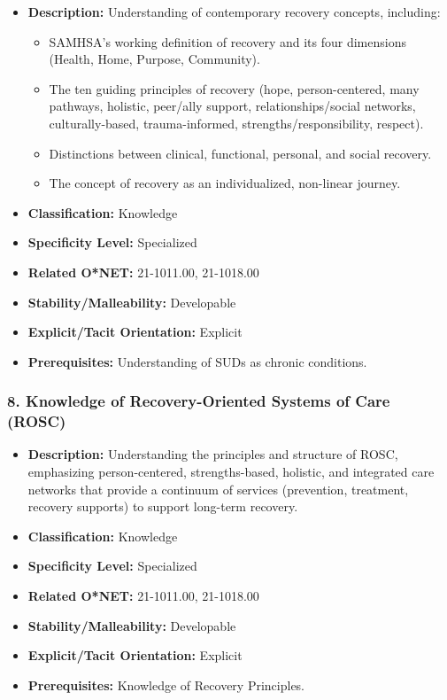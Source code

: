 \documentclass[
  letterpaper,
  DIV=11,
  numbers=noendperiod]{scrartcl}
\providecommand{\tightlist}{%
  \setlength{\itemsep}{0pt}\setlength{\parskip}{0pt}}
\begin{document}
\begin{itemize}
\tightlist
\item
  \textbf{Description:} Understanding of contemporary recovery concepts,
  including:

  \begin{itemize}
  \tightlist
  \item
    SAMHSA's working definition of recovery and its four dimensions
    (Health, Home, Purpose, Community).
  \item
    The ten guiding principles of recovery (hope, person-centered, many
    pathways, holistic, peer/ally support, relationships/social
    networks, culturally-based, trauma-informed,
    strengths/responsibility, respect).
  \item
    Distinctions between clinical, functional, personal, and social
    recovery.
  \item
    The concept of recovery as an individualized, non-linear journey.
  \end{itemize}
\item
  \textbf{Classification:} Knowledge
\item
  \textbf{Specificity Level:} Specialized
\item
  \textbf{Related O*NET:} 21-1011.00, 21-1018.00
\item
  \textbf{Stability/Malleability:} Developable
\item
  \textbf{Explicit/Tacit Orientation:} Explicit
\item
  \textbf{Prerequisites:} Understanding of SUDs as chronic conditions.
\end{itemize}

\subsubsection{8. Knowledge of Recovery-Oriented Systems of Care
(ROSC)}\label{knowledge-of-recovery-oriented-systems-of-care-rosc}

\begin{itemize}
\tightlist
\item
  \textbf{Description:} Understanding the principles and structure of
  ROSC, emphasizing person-centered, strengths-based, holistic, and
  integrated care networks that provide a continuum of services
  (prevention, treatment, recovery supports) to support long-term
  recovery.
\item
  \textbf{Classification:} Knowledge
\item
  \textbf{Specificity Level:} Specialized
\item
  \textbf{Related O*NET:} 21-1011.00, 21-1018.00
\item
  \textbf{Stability/Malleability:} Developable
\item
  \textbf{Explicit/Tacit Orientation:} Explicit
\item
  \textbf{Prerequisites:} Knowledge of Recovery Principles.
\end{itemize}
\end{document}
